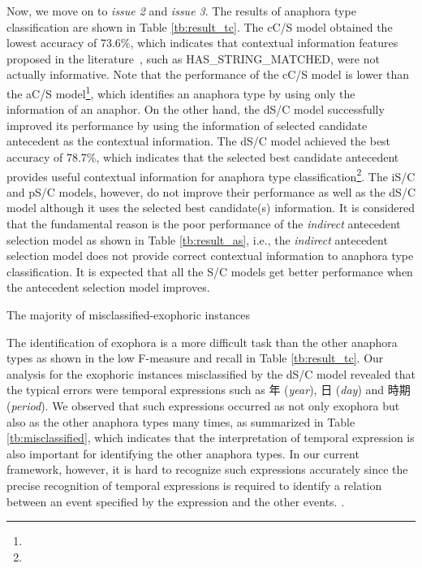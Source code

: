 \documentclass[english]{jnlp_1.4}
\newcommand{\wire}[1]{}
\begin{document}
Now, we move on to \emph{issue 2} and \emph{issue 3}. The results of
anaphora type classification are shown in Table
\ref{tb:result_tc}. The cC/S model obtained the lowest accuracy of
73.6\%, which indicates that contextual information features proposed
in the literature~, such as
HAS\_STRING\_MATCHED, were not actually informative. Note that the
performance of the cC/S model is lower than the aC/S
model\footnote{\wire{The difference is statistically significant
    ($p<0.06$, McNemar test).}}, which identifies an anaphora type by
using only the information of an anaphor. On the other hand, the dS/C
model successfully improved its performance by using the information
of selected candidate antecedent as the contextual information. The
dS/C model achieved the best accuracy of 78.7\%, which indicates that
the selected best candidate antecedent provides useful contextual
information for anaphora type classification\footnote{\wire{The dS/C
    model outperformed the aC/S, cC/S models with statistical
    significance using $p<0.03$, $p<0.01$, as McNemar test parameters
    respectively.}}. The iS/C and pS/C models, however, do not improve
their performance as well as the dS/C model although it uses the
selected best candidate(s) information. It is considered that the
fundamental reason is the poor performance of the \emph{indirect}
antecedent selection model as shown in Table \ref{tb:result_as}, i.e.,
the \emph{indirect} antecedent selection model does not provide
correct contextual information to anaphora type classification.  It is
expected that all the S/C models get better performance when the
antecedent selection model improves.

\begin{table}[b]
\caption{The majority of misclassified-exophoric instances}
  \label{tb:misclassified}

\end{table}

The identification of exophora is a more difficult task than the other
anaphora types as shown in the low F-measure and recall in Table
\ref{tb:result_tc}. Our analysis for the exophoric instances
misclassified by the dS/C model revealed that the typical errors were
temporal expressions such as 年 (\emph{year}), 日 (\emph{day})
and 時期 (\emph{period}). We observed that such expressions occurred
as not only exophora but also as the other anaphora types many times,
as summarized in Table \ref{tb:misclassified}, which indicates that
the interpretation of temporal expression is also important for
identifying the other anaphora types. In our current framework,
however, it is hard to recognize such expressions accurately since the
precise recognition of temporal expressions is required to identify a
relation between an event specified by the expression and the other
events. \wire{We consider integrating the framework of temporal
  relation identification, which has been proposed in the
  evaluation-oriented studies such as
  TempEval\footnote{http://www.timeml.org/tempeval/}, with anaphora
  type classification framework, which will be our future work}.
\end{document}
